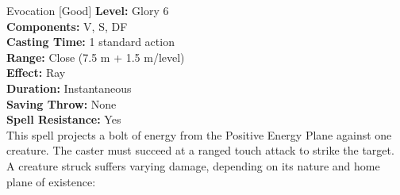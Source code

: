 {Evocation [Good]}
{
	\textbf{Level:} Glory 6\\
	\textbf{Components:} V, S, DF\\
	\textbf{Casting Time:} 1 standard action\\
	\textbf{Range:} Close (7.5 m + 1.5 m/level)\\
	\textbf{Effect:} Ray\\
	\textbf{Duration:} Instantaneous\\
	\textbf{Saving Throw:} None\\
	\textbf{Spell Resistance:} Yes\\
}
{
	This spell projects a bolt of energy from the Positive Energy Plane against one creature. The caster must succeed at a ranged touch attack to strike the target. A creature struck suffers varying damage, depending on its nature and home plane of existence:\\

}